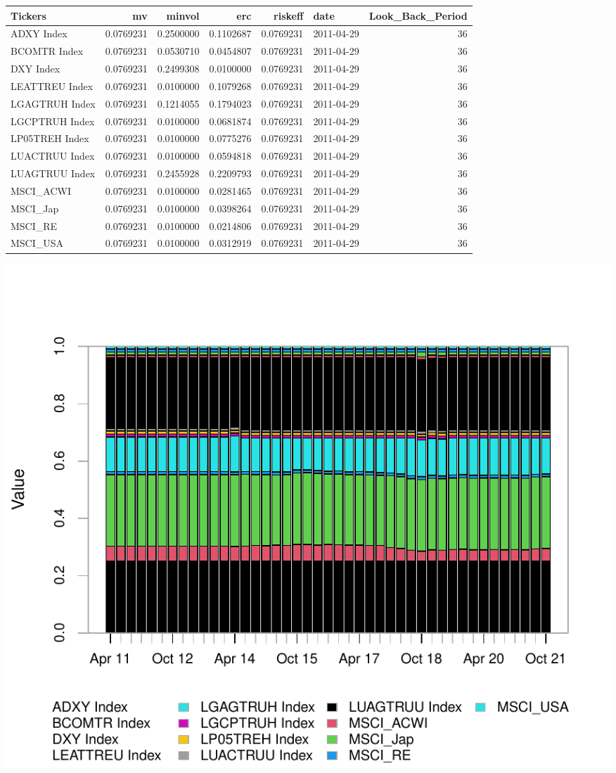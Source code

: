 \documentclass[12pt,preprint, authoryear]{elsarticle}
\numberwithin{equation}{section}
\numberwithin{figure}{section}
\numberwithin{table}{section}
\begin{document}
\begin{tabular}{l|r|r|r|r|l|r}
\hline
Tickers & mv & minvol & erc & riskeff & date & Look\_Back\_Period\\
\hline
ADXY Index & 0.0769231 & 0.2500000 & 0.1102687 & 0.0769231 & 2011-04-29 & 36\\
\hline
BCOMTR Index & 0.0769231 & 0.0530710 & 0.0454807 & 0.0769231 & 2011-04-29 & 36\\
\hline
DXY Index & 0.0769231 & 0.2499308 & 0.0100000 & 0.0769231 & 2011-04-29 & 36\\
\hline
LEATTREU Index & 0.0769231 & 0.0100000 & 0.1079268 & 0.0769231 & 2011-04-29 & 36\\
\hline
LGAGTRUH Index & 0.0769231 & 0.1214055 & 0.1794023 & 0.0769231 & 2011-04-29 & 36\\
\hline
LGCPTRUH Index & 0.0769231 & 0.0100000 & 0.0681874 & 0.0769231 & 2011-04-29 & 36\\
\hline
LP05TREH Index & 0.0769231 & 0.0100000 & 0.0775276 & 0.0769231 & 2011-04-29 & 36\\
\hline
LUACTRUU Index & 0.0769231 & 0.0100000 & 0.0594818 & 0.0769231 & 2011-04-29 & 36\\
\hline
LUAGTRUU Index & 0.0769231 & 0.2455928 & 0.2209793 & 0.0769231 & 2011-04-29 & 36\\
\hline
MSCI\_ACWI & 0.0769231 & 0.0100000 & 0.0281465 & 0.0769231 & 2011-04-29 & 36\\
\hline
MSCI\_Jap & 0.0769231 & 0.0100000 & 0.0398264 & 0.0769231 & 2011-04-29 & 36\\
\hline
MSCI\_RE & 0.0769231 & 0.0100000 & 0.0214806 & 0.0769231 & 2011-04-29 & 36\\
\hline
MSCI\_USA & 0.0769231 & 0.0100000 & 0.0312919 & 0.0769231 & 2011-04-29 & 36\\
\hline
\end{tabular}

\includegraphics{Question-6_files/figure-latex/unnamed-chunk-4-1.pdf}
\end{document}
